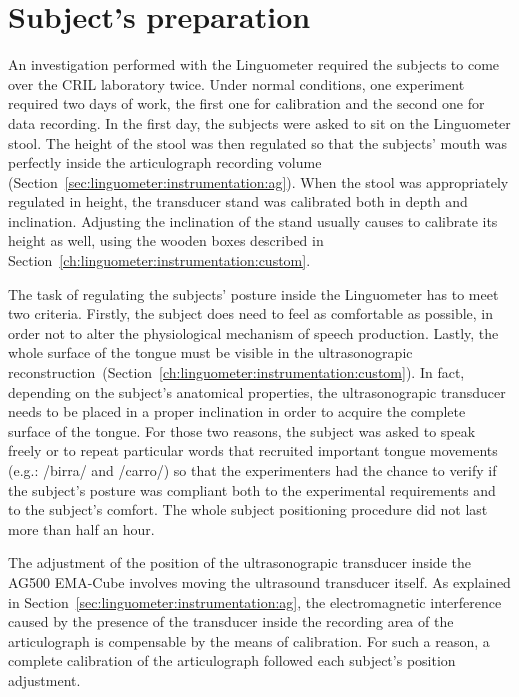 \section{Subject's preparation}
\label{sec:experiments:preparation}
An investigation performed with the Linguometer required the subjects to come
over the CRIL laboratory twice.
Under normal conditions, one experiment required two days of work, the first
one for calibration and the second one for data recording.
In the first day, the subjects were asked to sit on the Linguometer stool. 
The height of the stool was then regulated so that the subjects' mouth was
perfectly inside the articulograph recording volume
(Section~\ref{sec:linguometer:instrumentation:ag}).
When the stool was appropriately regulated in height, the transducer stand was
calibrated both in depth and inclination. 
Adjusting the inclination of the stand usually causes to calibrate its height as
well, using the wooden boxes described
in Section~\ref{ch:linguometer:instrumentation:custom}.


The task of regulating the subjects' posture inside the Linguometer has to meet
two criteria. Firstly, the subject does need to feel as comfortable as possible,
in order not to alter the physiological mechanism of speech production.
Lastly, the whole surface of the tongue must be visible in the ultrasonograpic
reconstruction~(Section~\ref{ch:linguometer:instrumentation:custom}).
In fact, depending on the subject's anatomical properties, the ultrasonograpic
transducer needs to be placed in a proper inclination in order to acquire
the complete surface of the tongue.
For those two reasons, the subject was asked to speak freely or to repeat
particular words that recruited important tongue movements
(e.g.: /birra/ and /carro/) so that the experimenters had the chance to verify
if the subject's posture was compliant both to the experimental requirements 
and to the subject's comfort.
The whole subject positioning procedure did not last more than half an hour. 

The adjustment of the position of the ultrasonograpic transducer inside the
AG500 EMA-Cube involves moving the ultrasound transducer itself.
As explained in Section~\ref{sec:linguometer:instrumentation:ag}, the electromagnetic
interference caused by the presence of the transducer inside the recording area
of the articulograph is compensable by the means of calibration.
For such a reason, a complete calibration of the articulograph followed each
subject's position adjustment.\\

